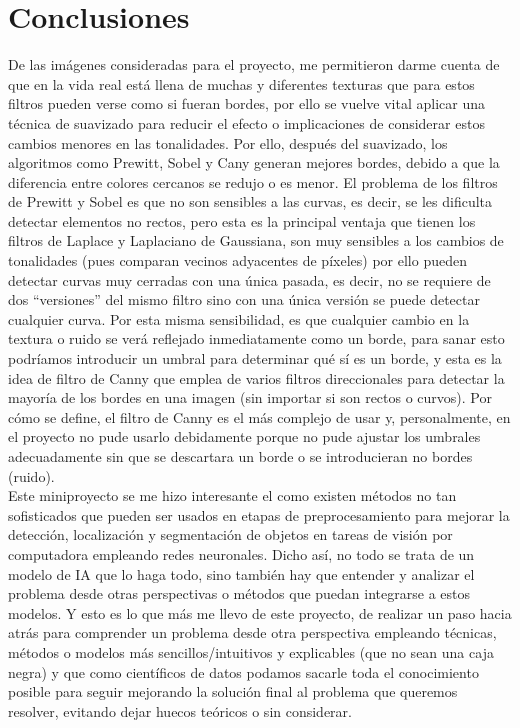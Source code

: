 \section{Conclusiones}
    De las imágenes consideradas para el proyecto, me permitieron 
    darme cuenta de que en la vida real está llena de muchas y diferentes 
    texturas que para estos filtros pueden verse como si fueran 
    bordes, por ello se vuelve vital aplicar una técnica de suavizado 
    para reducir el efecto o implicaciones de considerar estos 
    cambios menores en las tonalidades. Por ello, después del suavizado, 
    los algoritmos como Prewitt, Sobel y Cany generan mejores bordes, 
    debido a que la diferencia entre colores cercanos se redujo o 
    es menor. El problema de los filtros de Prewitt y Sobel es que 
    no son sensibles a las curvas, es decir, se les dificulta detectar 
    elementos no rectos, pero esta es la principal ventaja que tienen 
    los filtros de Laplace y Laplaciano de Gaussiana, son muy sensibles 
    a los cambios de tonalidades (pues comparan vecinos adyacentes de 
    píxeles) por ello pueden detectar curvas muy 
    cerradas con una única pasada, es decir, no se requiere de dos 
    ``versiones'' del mismo filtro sino con una única versión se 
    puede detectar cualquier curva. Por esta misma sensibilidad, es que 
    cualquier cambio en la textura o ruido se verá reflejado inmediatamente  
    como un borde, para sanar esto podríamos introducir un umbral para 
    determinar qué sí es un borde, y esta es la idea de filtro de Canny 
    que emplea de varios filtros direccionales para detectar la mayoría 
    de los bordes en una imagen (sin importar si son rectos o curvos). 
    Por cómo se define, el filtro de Canny es el más complejo de usar 
    y, personalmente, en el proyecto no pude usarlo debidamente porque 
    no pude ajustar los umbrales adecuadamente sin que se descartara 
    un borde o se introducieran no bordes (ruido).\\

    Este miniproyecto se me hizo interesante el como existen métodos 
    no tan sofisticados que pueden ser usados en etapas de preprocesamiento 
    para mejorar la detección, localización y segmentación de objetos 
    en tareas de visión por computadora empleando redes neuronales. 
    Dicho así, no todo se trata de un modelo de IA que lo haga todo, sino 
    también hay que entender y analizar el problema desde otras 
    perspectivas o métodos que puedan integrarse a estos modelos. 
    Y esto es lo que más me llevo de este proyecto, de realizar un paso 
    hacia atrás para comprender un problema desde otra perspectiva 
    empleando técnicas, métodos o modelos más sencillos/intuitivos 
    y explicables (que no sean una caja negra) y que como científicos 
    de datos podamos sacarle toda el conocimiento posible para 
    seguir mejorando la solución final al problema que queremos 
    resolver, evitando dejar huecos teóricos o sin considerar.